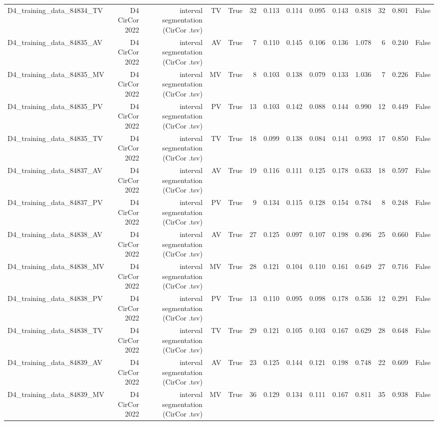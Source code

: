 \begin{table}[htbp]
\begin{tabular}{lrrrrrrrrrrrrr}
    D4\_training\_data\_84834\_TV & D4 CirCor 2022 & interval segmentation (CirCor .tsv) & TV & True & 32 & 0.113 & 0.114 & 0.095 & 0.143 & 0.818 & 32 & 0.801 & False \\
    D4\_training\_data\_84835\_AV & D4 CirCor 2022 & interval segmentation (CirCor .tsv) & AV & True & 7 & 0.110 & 0.145 & 0.106 & 0.136 & 1.078 & 6 & 0.240 & False \\
    D4\_training\_data\_84835\_MV & D4 CirCor 2022 & interval segmentation (CirCor .tsv) & MV & True & 8 & 0.103 & 0.138 & 0.079 & 0.133 & 1.036 & 7 & 0.226 & False \\
    D4\_training\_data\_84835\_PV & D4 CirCor 2022 & interval segmentation (CirCor .tsv) & PV & True & 13 & 0.103 & 0.142 & 0.088 & 0.144 & 0.990 & 12 & 0.449 & False \\
    D4\_training\_data\_84835\_TV & D4 CirCor 2022 & interval segmentation (CirCor .tsv) & TV & True & 18 & 0.099 & 0.138 & 0.084 & 0.141 & 0.993 & 17 & 0.850 & False \\
    D4\_training\_data\_84837\_AV & D4 CirCor 2022 & interval segmentation (CirCor .tsv) & AV & True & 19 & 0.116 & 0.111 & 0.125 & 0.178 & 0.633 & 18 & 0.597 & False \\
    D4\_training\_data\_84837\_PV & D4 CirCor 2022 & interval segmentation (CirCor .tsv) & PV & True & 9 & 0.134 & 0.115 & 0.128 & 0.154 & 0.784 & 8 & 0.248 & False \\
    D4\_training\_data\_84838\_AV & D4 CirCor 2022 & interval segmentation (CirCor .tsv) & AV & True & 27 & 0.125 & 0.097 & 0.107 & 0.198 & 0.496 & 25 & 0.660 & False \\
    D4\_training\_data\_84838\_MV & D4 CirCor 2022 & interval segmentation (CirCor .tsv) & MV & True & 28 & 0.121 & 0.104 & 0.110 & 0.161 & 0.649 & 27 & 0.716 & False \\
    D4\_training\_data\_84838\_PV & D4 CirCor 2022 & interval segmentation (CirCor .tsv) & PV & True & 13 & 0.110 & 0.095 & 0.098 & 0.178 & 0.536 & 12 & 0.291 & False \\
    D4\_training\_data\_84838\_TV & D4 CirCor 2022 & interval segmentation (CirCor .tsv) & TV & True & 29 & 0.121 & 0.105 & 0.103 & 0.167 & 0.629 & 28 & 0.648 & False \\
    D4\_training\_data\_84839\_AV & D4 CirCor 2022 & interval segmentation (CirCor .tsv) & AV & True & 23 & 0.125 & 0.144 & 0.121 & 0.198 & 0.748 & 22 & 0.609 & False \\
    D4\_training\_data\_84839\_MV & D4 CirCor 2022 & interval segmentation (CirCor .tsv) & MV & True & 36 & 0.129 & 0.134 & 0.111 & 0.167 & 0.811 & 35 & 0.938 & False \\

\end{tabular}
\end{table}
